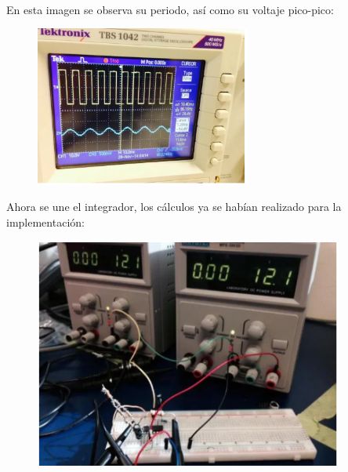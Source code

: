 \documentclass[12pt]{article}
\begin{document}

\href{https://carlosalbertosainz.files.wordpress.com/2014/12/pic1.jpg}{\\
}\par

\begin{Center}
\textcolor[HTML]{656565}{En esta imagen se observa su periodo, así como su voltaje pico-pico:}
\end{Center}\par




\begin{figure}[H]
	\begin{Center}
		\includegraphics[width=2.79in,height=2.08in]{./media/image12.png}
	\end{Center}
\end{figure}



\par


\begin{Center}
\textcolor[HTML]{656565}{Ahora se une el integrador, los cálculos ya se habían realizado para la implementación:}
\end{Center}\par




\begin{figure}[H]
	\begin{Center}
		\includegraphics[width=4.0in,height=2.98in]{./media/image13.png}
	\end{Center}
\end{figure}
\end{document}
